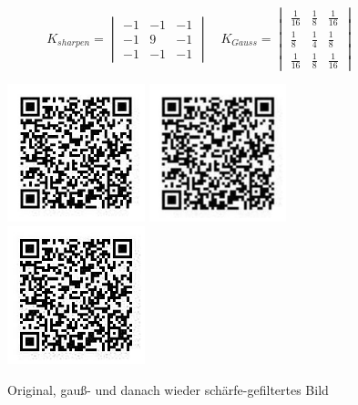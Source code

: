 \begin{equation}
  K_{sharpen} = \begin{vmatrix}
    -1 & -1 & -1 \\
    -1 &  9 & -1 \\
    -1 & -1 & -1
  \end{vmatrix}
  \quad
  K_{Gauss} = \begin{vmatrix}
    \frac{1}{16} & \frac{1}{8} & \frac{1}{16} \\
    \frac{1}{ 8} & \frac{1}{4} & \frac{1}{ 8} \\
    \frac{1}{16} & \frac{1}{8} & \frac{1}{16}
  \end{vmatrix}
\end{equation}
\begin{figure}[H]
  \centering
  \includegraphics[height=4cm]{img/QR/perfect_03.jpg}
  \includegraphics[height=4cm]{img/QR/qr-gauss.jpg}
  \includegraphics[height=4cm]{img/QR/qr-sharp.jpg}
  \caption{Original, gauß- und danach wieder schärfe-gefiltertes Bild}
  \label{fig:sharpgauss}
\end{figure}

